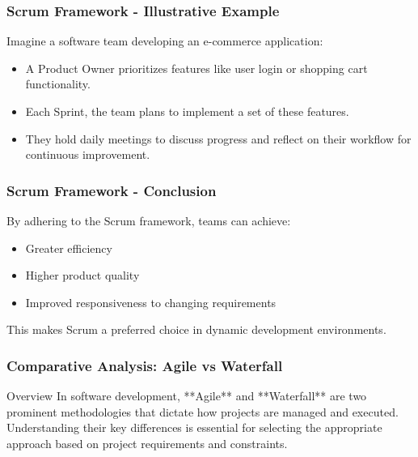 \documentclass{beamer}
\begin{document}
\begin{frame}[fragile]
    \frametitle{Scrum Framework - Illustrative Example}
    Imagine a software team developing an e-commerce application:
    \begin{itemize}
        \item A Product Owner prioritizes features like user login or shopping cart functionality.
        \item Each Sprint, the team plans to implement a set of these features.
        \item They hold daily meetings to discuss progress and reflect on their workflow for continuous improvement.
    \end{itemize}
\end{frame}

\begin{frame}[fragile]
    \frametitle{Scrum Framework - Conclusion}
    By adhering to the Scrum framework, teams can achieve:
    \begin{itemize}
        \item Greater efficiency
        \item Higher product quality
        \item Improved responsiveness to changing requirements
    \end{itemize}
    This makes Scrum a preferred choice in dynamic development environments.
\end{frame}

\begin{frame}[fragile]
    \frametitle{Comparative Analysis: Agile vs Waterfall}
    \begin{block}{Overview}
        In software development, **Agile** and **Waterfall** are two prominent methodologies that dictate how projects are managed and executed. Understanding their key differences is essential for selecting the appropriate approach based on project requirements and constraints.
    \end{block}
\end{frame}
\end{document}
